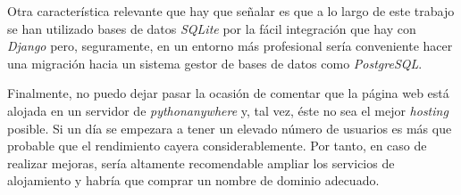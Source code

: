 Otra característica relevante que hay que señalar es que a lo largo de este trabajo se han utilizado bases de datos \emph{SQLite} por la fácil integración que hay con \emph{Django} pero, seguramente, en un entorno más profesional sería conveniente hacer una migración hacia un sistema gestor de bases de datos como \emph{PostgreSQL}. 

Finalmente, no puedo dejar pasar la ocasión de comentar que la página web está alojada en un servidor de \emph{pythonanywhere} y, tal vez, éste no sea el mejor \emph{hosting}  posible. Si un día se empezara a tener un elevado número de usuarios es más que probable que el rendimiento cayera considerablemente. Por tanto, en caso de realizar mejoras, sería altamente recomendable ampliar los servicios de alojamiento y habría que comprar un nombre de dominio adecuado. 